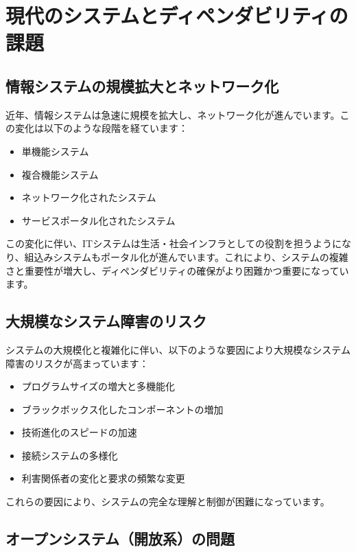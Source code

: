 \section{現代のシステムとディペンダビリティの課題}

\subsection{情報システムの規模拡大とネットワーク化}

近年、情報システムは急速に規模を拡大し、ネットワーク化が進んでいます。この変化は以下のような段階を経ています：

\begin{itemize}
\item 単機能システム
\item 複合機能システム
\item ネットワーク化されたシステム
\item サービスポータル化されたシステム
\end{itemize}

この変化に伴い、ITシステムは生活・社会インフラとしての役割を担うようになり、組込みシステムもポータル化が進んでいます。これにより、システムの複雑さと重要性が増大し、ディペンダビリティの確保がより困難かつ重要になっています。

\subsection{大規模なシステム障害のリスク}

システムの大規模化と複雑化に伴い、以下のような要因により大規模なシステム障害のリスクが高まっています：
\begin{itemize}
\item プログラムサイズの増大と多機能化
\item ブラックボックス化したコンポーネントの増加
\item 技術進化のスピードの加速
\item 接続システムの多様化
\item 利害関係者の変化と要求の頻繁な変更
\end{itemize}

これらの要因により、システムの完全な理解と制御が困難になっています。

\subsection{オープンシステム（開放系）の問題}

